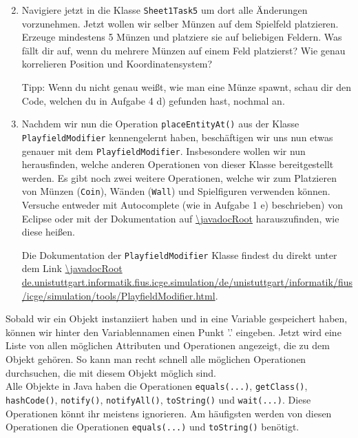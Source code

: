 \begin{enumerate} \setcounter{enumi}{1}
    \item Navigiere jetzt in die Klasse \lstinline{Sheet1Task5} um dort alle Änderungen vorzunehmen.
        Jetzt wollen wir selber Münzen auf dem Spielfeld platzieren.
        Erzeuge mindestens 5 Münzen und platziere sie auf beliebigen Feldern.
        Was fällt dir auf, wenn du mehrere Münzen auf einem Feld platzierst?
        Wie genau korrelieren Position und Koordinatensystem?

        Tipp: Wenn du nicht genau weißt, wie man eine Münze spawnt, schau dir den Code, welchen du in Aufgabe 4 d) gefunden hast, nochmal an.

    \item Nachdem wir nun die Operation \lstinline{placeEntityAt()} aus der Klasse \lstinline{PlayfieldModifier} kennengelernt haben, beschäftigen wir uns nun etwas genauer mit dem \lstinline{PlayfieldModifier}.
        Insbesondere wollen wir nun herausfinden, welche anderen Operationen von dieser Klasse bereitgestellt werden.
        Es gibt noch zwei weitere Operationen, welche wir zum Platzieren von Münzen (\lstinline{Coin}), Wänden (\lstinline{Wall}) und Spielfiguren verwenden können.
        Versuche entweder mit Autocomplete (wie in Aufgabe 1 e) beschrieben) von Eclipse oder mit der Dokumentation auf \url{\javadocRoot} harauszufinden, wie diese heißen.

        Die Dokumentation der \lstinline{PlayfieldModifier} Klasse findest du direkt unter dem Link \url{\javadocRoot de.unistuttgart.informatik.fius.icge.simulation/de/unistuttgart/informatik/fius/icge/simulation/tools/PlayfieldModifier.html}.

\end{enumerate}

\begin{Infobox}[Autocompletion]
    Sobald wir ein Objekt instanziiert haben und in eine Variable gespeichert haben, können wir hinter den Variablennamen einen Punkt '.' eingeben.
    Jetzt wird eine Liste von allen möglichen Attributen und Operationen angezeigt, die zu dem Objekt gehören.
    So kann man recht schnell alle möglichen Operationen durchsuchen, die mit diesem Objekt möglich sind.\\

    Alle Objekte in Java haben die Operationen \lstinline{equals(...)}, \lstinline{getClass()}, \lstinline{hashCode()}, \lstinline{notify()}, \lstinline{notifyAll()}, \lstinline{toString()} und \lstinline{wait(...)}.
    Diese Operationen könnt ihr meistens ignorieren.
    Am häufigsten werden von diesen Operationen die Operationen \lstinline{equals(...)} und \lstinline{toString()} benötigt.
\end{Infobox}

